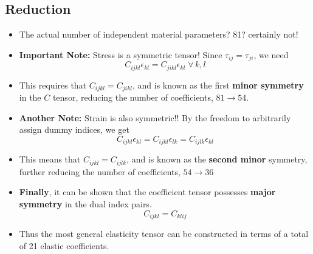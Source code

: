 \documentclass[11pt]{article}
\begin{document}
\subsection*{Reduction}
\label{sec:orgce86193}
\begin{itemize}
\item The actual number of independent material parameters? 81? certainly not!
\item \textbf{Important Note:} Stress is a symmetric tensor! Since \(\tau_{ij} = \tau_{ji}\), we need
$$ C_{ijkl} \epsilon_{kl} = C_{jikl} \epsilon_{kl} \; \forall \, k,l $$
\item This requires that \(C_{ijkl} = C_{jikl}\), and is known as the first \textbf{minor symmetry} in the \(C\) tensor, reducing the number of coefficients, \(81 \to 54\).
\item \textbf{Another Note:} Strain is also symmetric!! By the freedom to arbitrarily assign dummy indices, we get
$$ C_{ijkl} \epsilon_{kl} = C_{ijkl} \epsilon_{lk} = C_{ijlk} \epsilon_{kl} $$
\item This means that \(C_{ijkl} = C_{ijlk}\), and is known as the \textbf{second minor} symmetry, further reducing the number of coefficients, \(54 \to 36\)
\item \textbf{Finally}, it can be shown that the coefficient tensor possesses \textbf{major symmetry} in the dual index pairs.
$$ C_{ijkl} = C_{klij} $$
\item Thus the most general elasticity tensor can be constructed in terms of a total of 21 elastic coefficients.
\end{itemize}
\end{document}
